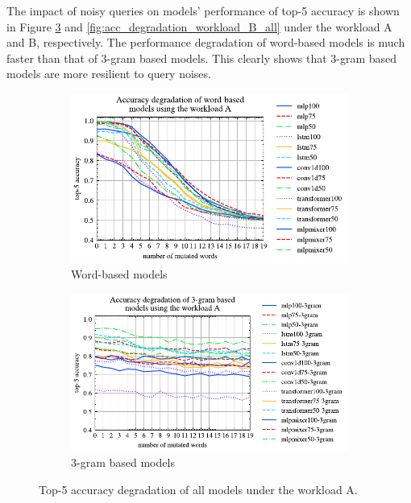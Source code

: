 The impact of noisy queries on models' performance of top-5 accuracy is shown in Figure \ref{fig:acc_degradation_workload_A_all} and \ref{fig:acc_degradation_workload_B_all}  under  the workload A and B, respectively. The performance degradation of word-based models is much faster than that of 3-gram based models. This clearly shows that 3-gram based models are more resilient to query noises.
\begin{figure}[!th]
	\centering
	\begin{subfigure}[t]{0.95\textwidth}
		\includegraphics[]{my/graphics/acc_degradation_word_based_A.pdf}
		\caption{Word-based models}
		\label{fig:acc_degradation_workload_A_word_based}
	\end{subfigure}
	\vfill
	\begin{subfigure}[t]{0.95\textwidth}
		\includegraphics[]{my/graphics/acc_degradation_3gram_based_A.pdf}
		\caption{3-gram based models}
		\label{fig:acc_degradation_workload_A_3gram}
	\end{subfigure}
	\caption{Top-5 accuracy degradation of all models under the workload A.}
	\label{fig:acc_degradation_workload_A_all}
\end{figure}
